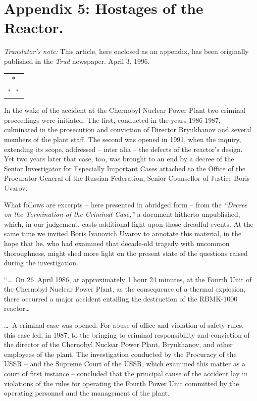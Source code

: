 \documentclass[openright]{bookest}
\newcommand{\varthreestars}{\begin{center}\begin{tabular}{c}$\ast$\\[-0.8ex] $\ast\enspace \ast $\end{tabular}\end{center}}
\begin{document}
\chapter*{Appendix 5: Hostages of the Reactor.}

\textit{Translator's note:} This article, here enclosed as an appendix, has been originally published in the \textit{Trud} newspaper. April 3, 1996.

\varthreestars

In the wake of the accident at the Chernobyl Nuclear Power Plant two criminal proceedings were initiated. The first, conducted in the years 1986-1987, culminated in the prosecution and conviction of Director Bryukhanov and several members of the plant staff. The second was opened in 1991, when the inquiry, extending its scope, addressed -- inter alia -- the defects of the reactor's design. Yet two years later that case, too, was brought to an end by a decree of the Senior Investigator for Especially Important Cases attached to the Office of the Procurator General of the Russian Federation, Senior Counsellor of Justice Boris Uvarov.

What follows are excerpts -- here presented in abridged form -- from the \textit{``Decree on the Termination of the Criminal Case,''} a document hitherto unpublished, which, in our judgement, casts additional light upon those dreadful events. At the same time we invited Boris Ivanovich Uvarov to annotate this material, in the hope that he, who had examined that decade-old tragedy with uncommon thoroughness, might shed more light on the present state of the questions raised during the investigation.

\medskip

``\ldots~On 26~April 1986, at approximately 1 hour 24 minutes, at the Fourth Unit of the Chernobyl Nuclear Power Plant, as the consequence of a thermal explosion, there occurred a major accident entailing the destruction of the RBMK-1000 reactor\ldots

\ldots~A criminal case was opened. For abuse of office and violation of safety rules, this case led, in 1987, to the bringing to criminal responsibility and conviction of the director of the Chernobyl Nuclear Power Plant, Bryukhanov, and other employees of the plant. The investigation conducted by the Procuracy of the USSR -- and the Supreme Court of the USSR, which examined this matter as a court of first instance -- concluded that the principal cause of the accident lay in violations of the rules for operating the Fourth Power Unit committed by the operating personnel and the management of the plant.
\end{document}
